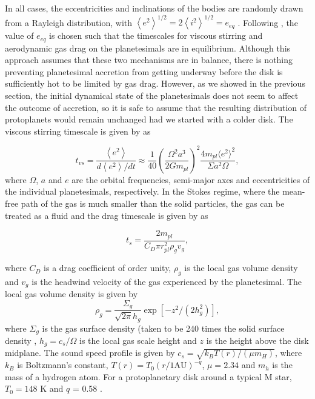 \documentclass[twocolumn,linenumbers]{aastex63}
\begin{document}
In all cases, the eccentricities and inclinations of the bodies are randomly drawn from a Rayleigh distribution, with $\left< e^{2} \right>^{1/2} = 2\left<i^{2} \right>^{1/2} = e_{eq}$ \citep{ida93}. Following \citet{kokubo98}, the value of $e_{eq}$ is chosen such that the timescales for viscous stirring and aerodynamic gas drag on the planetesimals are in equilibrium. Although this approach assumes that these two mechanisms are in balance, there is nothing preventing planetesimal accretion from getting underway before the disk is sufficiently hot to be limited by gas drag. However, as we showed in the previous section, the initial dynamical state of the planetesimals does not seem to affect the outcome of accretion, so it is safe to assume that the resulting distribution of protoplanets would remain unchanged had we started with a colder disk. The viscous stirring timescale is given by \citet{ida93} as

\begin{equation}\label{eq:vs_timescale}
    t_{vs}  = \frac{\left< e^2 \right>}{d \left< e^2 \right> / dt} \approx \frac{1}{40}\left(\frac{\Omega^{2} a^{3}}{2 G m_{pl}}\right)^{2} \frac{4 m_{pl} \langle e^{2} \rangle^{2}}{\Sigma a^{2} \Omega},
\end{equation}
where $\Omega$, $a$ and $e$ are the orbital frequencies, semi-major axes and eccentricities of the individual planetesimals, respectively. In the Stokes regime, where the mean-free path of the gas is much smaller than the solid particles, the gas can be treated as a fluid and the drag timescale is given by \citet{adachi76} as

\begin{equation}\label{eq:ts_stokes}
    t_{s} = \frac{2 m_{pl}}{C_{D} \pi r_{pl}^{2} \rho_{g} v_{g}},
\end{equation}

where $C_{D}$ is a drag coefficient of order unity, $\rho_{g}$ is the local gas volume density and $v_{g}$ is the headwind velocity of the gas experienced by the planetesimal. The local gas volume density is given by
\begin{equation}\label{eq:rho_gas}
	\rho_{g} = \frac{\Sigma_{g}}{\sqrt{2 \pi} h_{g}} \exp\left[ -z^{2} / \left( 2 h_{g}^{2} \right) \right],
\end{equation}
where $\Sigma_{g}$ is the gas surface density (taken to be
240 times the solid surface density \citep{hayashi81}, $h_{g} = c_{s} / \Omega$ is the local gas scale height and $z$ is the height above the disk midplane. The sound speed profile is given by $c_{s} = \sqrt{k_{B} T(r) / \left( \mu m_{H} \right)}$, where $k_{B}$ is Boltzmann's constant, $T(r) = T_{0} \left( r / 1 \textrm{AU} \right)^{-q}$, $\mu = 2.34$ and $m_{h}$ is the mass of a hydrogen atom. For a protoplanetary disk around a typical M star, $T_{0} = 148$ K and $q$ = 0.58 \citep{andrews05}.
\end{document}
